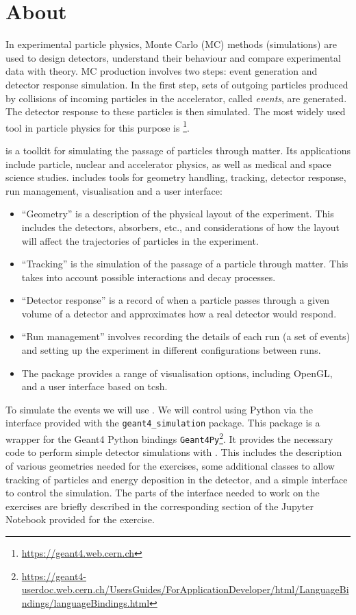 \documentclass[a4paper,12pt]{article}
\begin{document}
\names %

\section*{About \geant}
In experimental particle physics, Monte Carlo (MC) methods (simulations) are used to design detectors, understand their behaviour and compare experimental data with theory.
MC production involves two steps: event generation and detector response simulation.
In the first step, sets of outgoing particles produced by collisions of incoming particles in the accelerator, called {\it events}, are generated.
The detector response to these particles is then simulated.
The most widely used tool in particle physics for this purpose is \geantf\footnote{\url{https://geant4.web.cern.ch}}.

\geantf is a toolkit for simulating the passage of particles through matter.
Its applications include particle, nuclear and accelerator physics, as well as medical and space science studies.
\geantf includes tools for geometry handling, tracking, detector response, run management, visualisation and a user interface:
\begin{itemize}
\item ``Geometry'' is a description of the physical layout of the experiment.
  This includes the detectors, absorbers, etc., and considerations of how the layout will affect the trajectories of particles in the experiment.
\item ``Tracking'' is the simulation of the passage of a particle through matter.
  This takes into account possible interactions and decay processes.
\item ``Detector response'' is a record of when a particle passes through a given volume of a detector and approximates how a real detector would respond.
\item ``Run management'' involves recording the details of each run (a set of events) and setting up the experiment in different configurations between runs.
\item The \geantf package provides a range of visualisation options, including OpenGL, and a user interface based on tcsh.
\end{itemize}

To simulate the events we will use \geantf.
We will control \geantf using Python via the interface provided with the \texttt{geant4\_simulation} package.
This package is a wrapper for the Geant4 Python bindings \texttt{Geant4Py}\footnote{\url{https://geant4-userdoc.web.cern.ch/UsersGuides/ForApplicationDeveloper/html/LanguageBindings/languageBindings.html}}.
It provides the necessary code to perform simple detector simulations with \geantf.
This includes the description of various geometries needed for the exercises, some additional classes to allow tracking of particles and energy deposition in the detector, and a simple interface to control the simulation.
The parts of the interface needed to work on the exercises are briefly described in the corresponding section of the Jupyter Notebook provided for the exercise.
\end{document}
